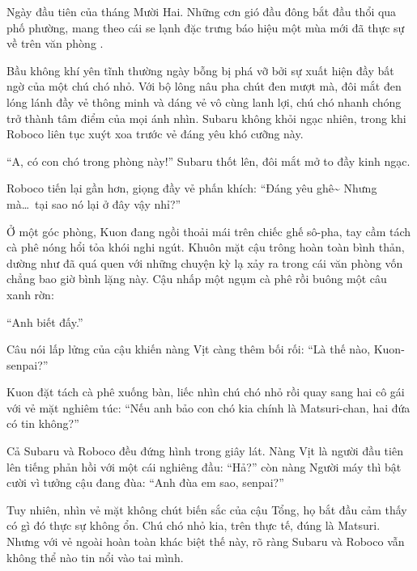 \documentclass[../main.tex]{subfiles}
\begin{document}

Ngày đầu tiên của tháng Mười Hai. Những cơn gió đầu đông bắt đầu thổi qua phố phường, mang theo cái se lạnh đặc trưng báo hiệu một mùa mới đã thực sự về trên văn phòng \hll.

Bầu không khí yên tĩnh thường ngày bỗng bị phá vỡ bởi sự xuất hiện đầy bất ngờ của một chú chó nhỏ. Với bộ lông nâu pha chút đen mượt mà, đôi mắt đen lóng lánh đầy vẻ thông minh và dáng vẻ vô cùng lanh lợi, chú chó nhanh chóng trở thành tâm điểm của mọi ánh nhìn. Subaru không khỏi ngạc nhiên, trong khi Roboco liên tục xuýt xoa trước vẻ đáng yêu khó cưỡng này.


``A, có con chó trong phòng này!'' Subaru thốt lên, đôi mắt mở to đầy kinh ngạc.

Roboco tiến lại gần hơn, giọng đầy vẻ phấn khích: ``Đáng yêu ghê\~{} Nhưng mà\dots\ tại sao nó lại ở đây vậy nhỉ?''

Ở một góc phòng, Kuon đang ngồi thoải mái trên chiếc ghế sô-pha, tay cầm tách cà phê nóng hổi tỏa khói nghi ngút. Khuôn mặt cậu trông hoàn toàn bình thản, dường như đã quá quen với những chuyện kỳ lạ xảy ra trong cái văn phòng vốn chẳng bao giờ bình lặng này. Cậu nhấp một ngụm cà phê rồi buông một câu xanh rờn:

``Anh biết đấy.''

Câu nói lấp lửng của cậu khiến nàng Vịt càng thêm bối rối: ``Là thế nào, Kuon-senpai?''

Kuon đặt tách cà phê xuống bàn, liếc nhìn chú chó nhỏ rồi quay sang hai cô gái với vẻ mặt nghiêm túc: ``Nếu anh bảo con chó kia chính là Matsuri-chan, hai đứa có tin không?''

Cả Subaru và Roboco đều đứng hình trong giây lát. Nàng Vịt là người đầu tiên lên tiếng phản hồi với một cái nghiêng đầu: ``Hả?'' còn nàng Người máy thì bật cười vì tưởng cậu đang đùa: ``Anh đùa em sao, senpai?''

Tuy nhiên, nhìn vẻ mặt không chút biến sắc của cậu Tổng, họ bắt đầu cảm thấy có gì đó thực sự không ổn. Chú chó nhỏ kia, trên thực tế, đúng là Matsuri. Nhưng với vẻ ngoài hoàn toàn khác biệt thế này, rõ ràng Subaru và Roboco vẫn không thể nào tin nổi vào tai mình.
\end{document}
